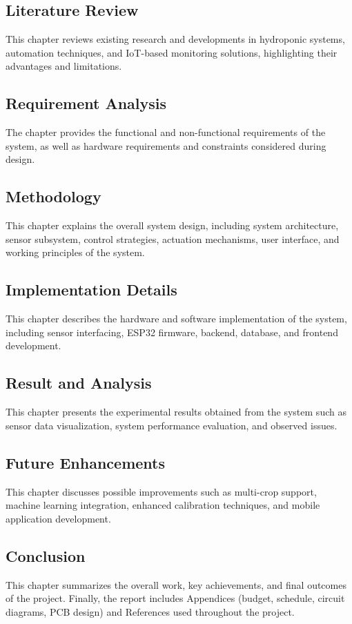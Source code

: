 \subsection{Literature Review}
This chapter reviews existing research and developments in hydroponic systems, automation techniques, and IoT-based monitoring solutions, highlighting their advantages and limitations.

\subsection{Requirement Analysis}
The chapter provides the functional and non-functional requirements of the system, as well as hardware requirements and constraints considered during design.

\subsection{Methodology}
This chapter explains the overall system design, including system architecture, sensor subsystem, control strategies, actuation mechanisms, user interface, and working principles of the system.

\subsection{Implementation Details}
This chapter describes the hardware and software implementation of the system, including sensor interfacing, ESP32 firmware, backend, database, and frontend development.

\subsection{Result and Analysis}
This chapter presents the experimental results obtained from the system such as sensor data visualization, system performance evaluation, and observed issues.

\subsection{Future Enhancements}
This chapter discusses possible improvements such as multi-crop support, machine learning integration, enhanced calibration techniques, and mobile application development.

\subsection{Conclusion }
This chapter summarizes the overall work, key achievements, and final outcomes of the project. 
Finally, the report includes Appendices (budget, schedule, circuit diagrams, PCB design) and References used throughout the project.
